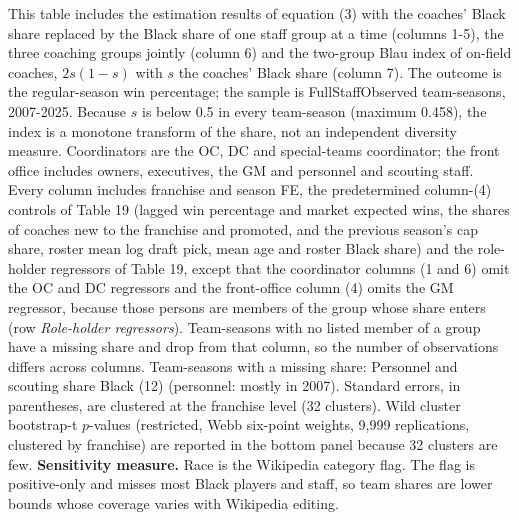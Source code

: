 \begin{table}[!h]
{\begin{threeparttable}
\begin{tablenotes}[para]
\item This table includes the estimation results of equation (3) with the coaches' Black share replaced by the Black share of one staff group at a time (columns 1-5), the three coaching groups jointly (column 6) and the two-group Blau index of on-field coaches, $2s(1-s)$ with $s$ the coaches' Black share (column 7). The outcome is the regular-season win percentage; the sample is FullStaffObserved team-seasons, 2007-2025.  Because $s$ is below 0.5 in every team-season (maximum 0.458), the index is a monotone transform of the share, not an independent diversity measure. Coordinators are the OC, DC and special-teams coordinator; the front office includes owners, executives, the GM and personnel and scouting staff. Every column includes franchise and season FE, the predetermined column-(4) controls of Table 19 (lagged win percentage and market expected wins, the shares of coaches new to the franchise and promoted, and the previous season's cap share, roster mean log draft pick, mean age and roster Black share) and the role-holder regressors of Table 19, except that the coordinator columns (1 and 6) omit the OC and DC regressors and the front-office column (4) omits the GM regressor, because those persons are members of the group whose share enters (row \textit{Role-holder regressors}). Team-seasons with no listed member of a group have a missing share and drop from that column, so the number of observations differs across columns. Team-seasons with a missing share: Personnel and scouting share Black (12) (personnel: mostly in 2007). Standard errors, in parentheses, are clustered at the franchise level (32 clusters). Wild cluster bootstrap-t $p$-values (restricted, Webb six-point weights, 9,999 replications, clustered by franchise) are reported in the bottom panel because 32 clusters are few. \textbf{Sensitivity measure.} Race is the Wikipedia category flag. The flag is positive-only and misses most Black players and staff, so team shares are lower bounds whose coverage varies with Wikipedia editing.
\end{tablenotes}
\end{threeparttable}}
\end{table}
